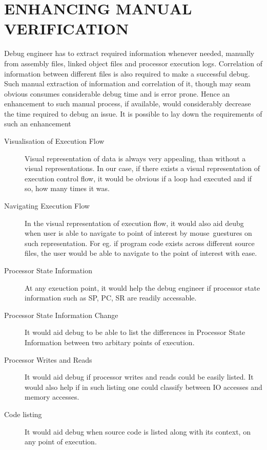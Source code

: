 \section {ENHANCING MANUAL VERIFICATION}
Debug engineer has to extract required information whenever needed, manually from assembly files, linked object files and processor execution logs. Correlation of information between different files is also required to make a successful debug. Such manual extraction of information and correlation of it, though may seam obvious consumes considerable debug time and is error prone. Hence an enhancement to such manual process, if available, would considerably decrease the time required to debug an issue. It is possible to lay down the requirements of such an enhancement

\begin{description}
\item[Visualisation of Execution Flow] Visual representation of data is always very appealing, than without a visual representations. In our case, if there exists a visual representation of execution control flow, it would be obvious if a loop had executed and if so, how many times it was.
\item[Navigating Execution Flow] In the visual representation of execution flow, it would also aid deubg when user is able to navigate to point of interest by mouse~guestures on such representation. For eg. if program code exists across different source files, the user would be able to navigate to the point of interest with ease.
\item[Processor State Information] At any exeuction point, it would help the debug engineer if processor state information such as SP, PC, SR are readily accessable.
\item[Processor State Information Change] It would aid debug to be able to list the differences in Processor State Information between two arbitary points of execution.
\item[Processor Writes and Reads] It would aid debug if processor writes and reads could be easily listed. It would also help if in such listing one could classify between IO accesses and memory accesses.
\item[Code listing] It would aid debug when source code is listed along with its context, on any point of execution.
\end{description}

